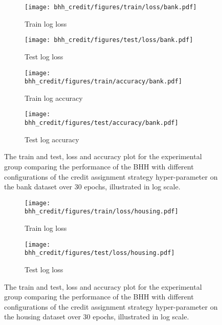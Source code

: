\begin{figure}[htbp]
	\begin{subfigure}{0.5\textwidth}
		\centering
		\texttt{[image: bhh\_credit/figures/train/loss/bank.pdf]}
		\caption{Train log loss}
		\label{fig:results:credit:figures:loss:train:bank}
	\end{subfigure}
	\begin{subfigure}{0.5\textwidth}
		\centering
		\texttt{[image: bhh\_credit/figures/test/loss/bank.pdf]}
		\caption{Test log loss}
		\label{fig:results:credit:figures:loss:test:bank}
	\end{subfigure}
	\par\bigskip
	\begin{subfigure}{0.5\textwidth}
		\centering
		\texttt{[image: bhh\_credit/figures/train/accuracy/bank.pdf]}
		\caption{Train log accuracy}
		\label{fig:results:credit:figures:accuracy:train:bank}
	\end{subfigure}
	\begin{subfigure}{0.5\textwidth}
		\centering
		\texttt{[image: bhh\_credit/figures/test/accuracy/bank.pdf]}
		\caption{Test log accuracy}
		\label{fig:results:credit:figures:accuracy:test:bank}
	\end{subfigure}
	\par\bigskip
	\caption{The train and test, loss and accuracy plot for the experimental group comparing the performance of the \acs{BHH} with different configurations of the credit assignment strategy hyper-parameter on the bank dataset over 30 epochs, illustrated in log scale.}
	\label{fig:results:credit:figures:bank}
\end{figure}



\begin{figure}[htbp]
	\begin{subfigure}{0.5\textwidth}
		\centering
		\texttt{[image: bhh\_credit/figures/train/loss/housing.pdf]}
		\caption{Train log loss}
		\label{fig:results:credit:figures:loss:train:housing}
	\end{subfigure}
	\begin{subfigure}{0.5\textwidth}
		\centering
		\texttt{[image: bhh\_credit/figures/test/loss/housing.pdf]}
		\caption{Test log loss}
		\label{fig:results:credit:figures:loss:test:housing}
	\end{subfigure}
	\par\bigskip
	\caption{The train and test, loss and accuracy plot for the experimental group comparing the performance of the \acs{BHH} with different configurations of the credit assignment strategy hyper-parameter on the housing dataset over 30 epochs, illustrated in log scale.}
	\label{fig:results:credit:figures:housing}
\end{figure}

